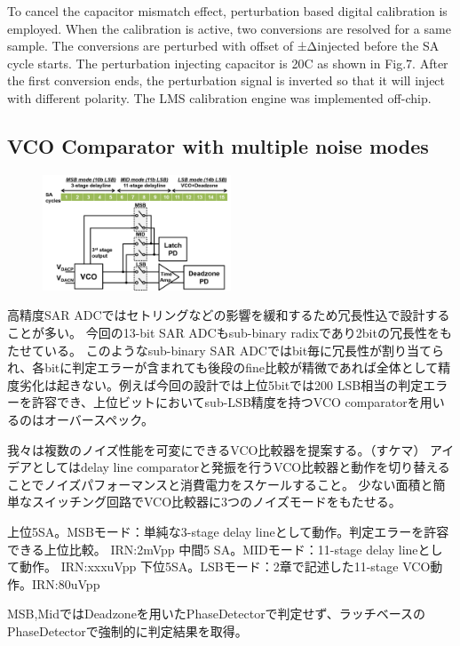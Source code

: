 \documentclass[letterpaper, 10 pt, conference]{ieeeconf}  %
\begin{document}
To cancel the capacitor mismatch effect, perturbation based digital calibration \cite{liu201012b} is employed. When the calibration is active, two conversions are resolved for a same sample. The conversions are perturbed with offset of ±Δinjected before the SA cycle starts. The perturbation injecting capacitor is 20C as shown in Fig.7. After the first conversion ends, the perturbation signal is inverted so that it will inject with different polarity. The LMS calibration engine was implemented off-chip.

\subsection{VCO Comparator with multiple noise modes}
\begin{figure}[ht!]
\centering
 \includegraphics[width=0.5\textwidth]{figs/vco-entire-r1.png}
  \label{highlight}
\end{figure}

高精度SAR ADCではセトリングなどの影響を緩和するため冗長性込で設計することが多い。
今回の13-bit SAR ADCもsub-binary radixであり2bitの冗長性をもたせている。
このようなsub-binary SAR ADCではbit毎に冗長性が割り当てられ、各bitに判定エラーが含まれても後段のfine比較が精微であれば全体として精度劣化は起きない。例えば今回の設計では上位5bitでは200 LSB相当の判定エラーを許容でき、上位ビットにおいてsub-LSB精度を持つVCO comparatorを用いるのはオーバースペック。

我々は複数のノイズ性能を可変にできるVCO比較器を提案する。（すケマ）
アイデアとしてはdelay line comparatorと発振を行うVCO比較器と動作を切り替えることでノイズパフォーマンスと消費電力をスケールすること。
少ない面積と簡単なスイッチング回路でVCO比較器に3つのノイズモードをもたせる。

上位5SA。MSBモード：単純な3-stage delay lineとして動作。判定エラーを許容できる上位比較。 IRN:2mVpp
中間5 SA。MIDモード：11-stage delay lineとして動作。 IRN:xxxuVpp
下位5SA。LSBモード：2章で記述した11-stage VCO動作。IRN:80uVpp

MSB,MidではDeadzoneを用いたPhaseDetectorで判定せず、ラッチベースのPhaseDetectorで強制的に判定結果を取得。
\end{document}
